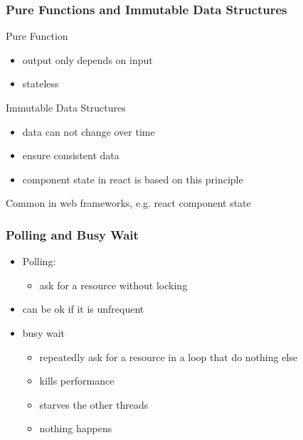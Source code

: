 \begin{frame}[fragile] \frametitle{Pure Functions and Immutable Data Structures}
Pure Function
\begin{itemize}
  \item output only depends on input
  \item stateless
\end{itemize}
\vspace{3mm}

Immutable Data Structures
\begin{itemize}
  \item data can not change over time
  \item ensure consistent data
  \item component state in react is based on this principle
\end{itemize}

\vspace{5mm}
Common in web frameworks, e.g. react component state
\end{frame}

\begin{frame}[fragile] \frametitle{Polling and Busy Wait}
\begin{itemize}
  \item Polling:
  \begin{itemize}
    \item ask for a resource without locking
  \end{itemize}
  \item can be ok if it is unfrequent
  \item busy wait
  \begin{itemize}
    \item repeatedly ask for a resource in a loop that do nothing else
    \item  kills performance
    \item starves the other threads
    \item nothing happens
  \end{itemize}
\end{itemize}
\end{frame}

